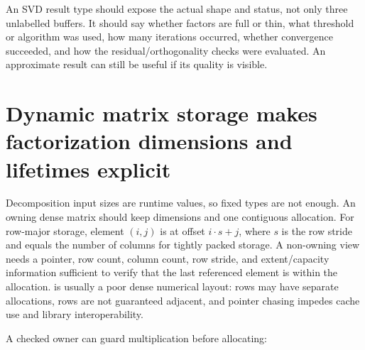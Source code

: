 An SVD result type should expose the actual shape and status, not only three unlabelled buffers. It should say whether factors are full or thin, what threshold or algorithm was used, how many iterations occurred, whether convergence succeeded, and how the residual/orthogonality checks were evaluated. An approximate result can still be useful if its quality is visible.

\section{Dynamic matrix storage makes factorization dimensions and lifetimes explicit}\label{02-foundations-ii-ch038-dynamic-matrix-storage-makes-factorization-dimensions-and-lifetimes-explicit}

\hypertarget{02-foundations-ii-ch038-dynamic-matrix-storage-makes-factorization-dimensions-and-lifetimes-explicit}{}

Decomposition input sizes are runtime values, so fixed  types are not enough. An owning dense matrix should keep dimensions and one contiguous allocation. For row-major storage, element \((i,j)\) is at offset \(i\cdot s+j\), where \(s\) is the row stride and equals the number of columns for tightly packed storage. A non-owning view needs a pointer, row count, column count, row stride, and extent/capacity information sufficient to verify that the last referenced element is within the allocation.  is usually a poor dense numerical layout: rows may have separate allocations, rows are not guaranteed adjacent, and pointer chasing impedes cache use and library interoperability.

A checked owner can guard multiplication before allocating:

